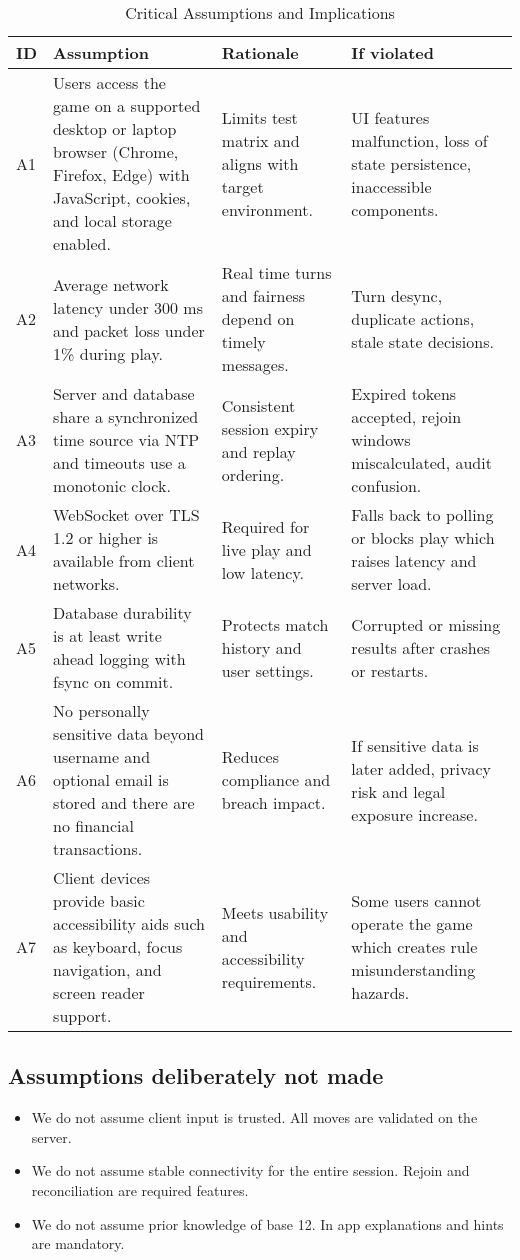 \documentclass{article}
\begin{document}
\begin{table}[hp]
\caption{Critical Assumptions and Implications}\label{tab:assumptions}
\begin{tabularx}{\textwidth}{lX X X}
\toprule
\textbf{ID} & \textbf{Assumption} & \textbf{Rationale} & \textbf{If violated} \\
\midrule
A1 & Users access the game on a supported desktop or laptop browser (Chrome, Firefox, Edge) with JavaScript, cookies, and local storage enabled. & Limits test matrix and aligns with target environment. & UI features malfunction, loss of state persistence, inaccessible components. \\
A2 & Average network latency under 300 ms and packet loss under 1\% during play. & Real time turns and fairness depend on timely messages. & Turn desync, duplicate actions, stale state decisions. \\
A3 & Server and database share a synchronized time source via NTP and timeouts use a monotonic clock. & Consistent session expiry and replay ordering. & Expired tokens accepted, rejoin windows miscalculated, audit confusion. \\
A4 & WebSocket over TLS 1.2 or higher is available from client networks. & Required for live play and low latency. & Falls back to polling or blocks play which raises latency and server load. \\
A5 & Database durability is at least write ahead logging with fsync on commit. & Protects match history and user settings. & Corrupted or missing results after crashes or restarts. \\
A6 & No personally sensitive data beyond username and optional email is stored and there are no financial transactions. & Reduces compliance and breach impact. & If sensitive data is later added, privacy risk and legal exposure increase. \\
A7 & Client devices provide basic accessibility aids such as keyboard, focus navigation, and screen reader support. & Meets usability and accessibility requirements. & Some users cannot operate the game which creates rule misunderstanding hazards. \\
\bottomrule
\end{tabularx}
\end{table}

\subsection*{Assumptions deliberately not made}
\begin{itemize}
  \item We do not assume client input is trusted. All moves are validated on the server.
  \item We do not assume stable connectivity for the entire session. Rejoin and reconciliation are required features.
  \item We do not assume prior knowledge of base 12. In app explanations and hints are mandatory.
\end{itemize}
\end{document}
